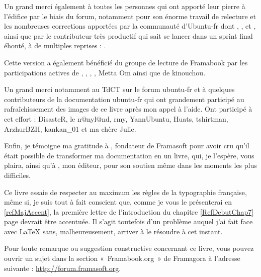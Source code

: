 \begin{Remerciements}
Un grand merci également à toutes les personnes qui ont apporté leur pierre à l'édifice par le biais du forum, notamment  pour son énorme travail de relecture et les nombreuses corrections apportées par la communauté d'Ubuntu-fr dont , ,  et , ainsi que par le contributeur très productif qui sait se lancer dans un sprint final éhonté, à de multiples reprises : .\par
Cette version a également bénéficié du groupe de lecture de Framabook par les participations actives de , , , , Metta Om ainsi que de kinouchou.\par
Un grand merci notamment au TdCT sur le forum ubuntu-fr et à quelques contributeurs de la documentation ubuntu-fr qui ont grandement participé au rafraîchissement des images de ce livre après mon appel à l'aide. Ont participé à cet effort : DisasteR, le n@nyl@nd, rmy, YannUbuntu, Huats, tshirtman, ArzhurBZH, kankan\_01 et ma chère Julie.\par
Enfin, je témoigne ma gratitude à , fondateur de Framasoft pour avoir cru qu'il était possible de transformer ma documentation en un livre, qui, je l'espère, vous plaira, ainsi qu'à , mon éditeur, pour son soutien même dans les moments les plus difficiles.\par
Ce livre essaie de respecter au maximum les règles de la typographie française, même si, je suis tout à fait conscient que, comme je vous le présenterai en \ref{refMajAccent}, la première lettre de l'introduction du chapitre \ref{RefDebutChap7} page \pageref{RefDebutChap7} devrait être accentuée. Il s'agit toutefois d'un problème auquel j'ai fait face avec \LaTeX{} sans, malheureusement, arriver à le résoudre à cet instant.\par
Pour toute remarque ou suggestion constructive concernant ce livre, vous pouvez ouvrir un sujet dans la section «~Framabook.org~» de Framagora à l'adresse suivante : \url{http://forum.framasoft.org}.\par
\end{Remerciements}
